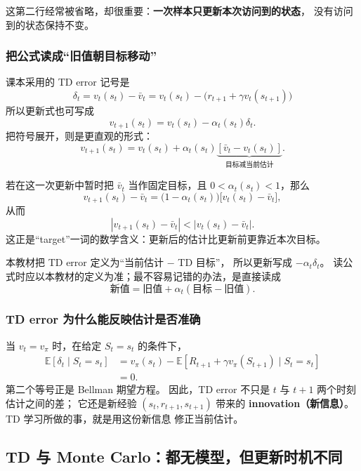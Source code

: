 \documentclass[11pt,a4paper,fontset=fandol]{ctexart}
\newcommand{\E}{\mathbb{E}}
\begin{document}
这第二行经常被省略，却很重要：\textbf{一次样本只更新本次访问到的状态}，
没有访问到的状态保持不变。

\subsubsection{把公式读成“旧值朝目标移动”}

课本采用的 TD error 记号是
\[
\boxed{
\delta_t
=
v_t(s_t)-\bar v_t
=
v_t(s_t)-\bigl(r_{t+1}+\gamma v_t(s_{t+1})\bigr)}
\]
所以更新式也可写成
\[
v_{t+1}(s_t)=v_t(s_t)-\alpha_t(s_t)\delta_t.
\]
把符号展开，则是更直观的形式：
\[
v_{t+1}(s_t)
=
v_t(s_t)
+\alpha_t(s_t)
\underbrace{\left[
\bar v_t-v_t(s_t)
\right]}_{\text{目标减当前估计}}.
\]

若在这一次更新中暂时把 \(\bar v_t\) 当作固定目标，且
\(0<\alpha_t(s_t)<1\)，那么
\[
v_{t+1}(s_t)-\bar v_t
=
\bigl(1-\alpha_t(s_t)\bigr)
\bigl[v_t(s_t)-\bar v_t\bigr],
\]
从而
\[
\left|v_{t+1}(s_t)-\bar v_t\right|
<
\left|v_t(s_t)-\bar v_t\right|.
\]
这正是“target”一词的数学含义：更新后的估计比更新前更靠近本次目标。

\begin{warningbox}
本教材把 TD error 定义为“当前估计 \(-\) TD 目标”，
所以更新写成 \(-\alpha_t\delta_t\)。
读公式时应以本教材的定义为准；最不容易记错的办法，是直接读成
\[
\text{新值}
=\text{旧值}
+\alpha_t(\text{目标}-\text{旧值}).
\]
\end{warningbox}

\subsubsection{TD error 为什么能反映估计是否准确}

当 \(v_t=v_\pi\) 时，在给定 \(S_t=s_t\) 的条件下，
\[
\begin{aligned}
\E[\delta_t\mid S_t=s_t]
&=
v_\pi(s_t)
-\E\!\left[
R_{t+1}+\gamma v_\pi(S_{t+1})
\mid S_t=s_t
\right]\\
&=0.
\end{aligned}
\]
第二个等号正是 Bellman 期望方程。
因此，TD error 不只是 \(t\) 与 \(t+1\) 两个时刻估计之间的差；
它还是新经验 \((s_t,r_{t+1},s_{t+1})\) 带来的
\textbf{innovation（新信息）}。TD 学习所做的事，就是用这份新信息
修正当前估计。

\subsection{TD 与 Monte Carlo：都无模型，但更新时机不同}
\end{document}
